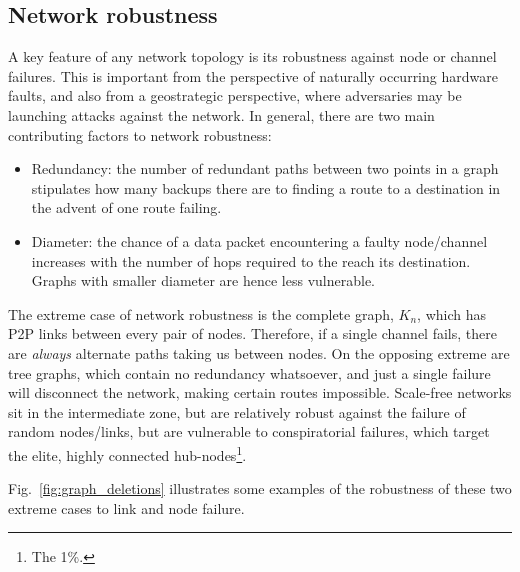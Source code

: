 \subsection{Network robustness}

A key feature of any network topology is its robustness against node or channel failures. This is important from the perspective of naturally occurring hardware faults, and also from a geostrategic perspective, where adversaries may be launching attacks against the network. In general, there are two main contributing factors to network robustness:
\begin{itemize}
	\item Redundancy: the number of redundant paths between two points in a graph stipulates how many backups there are to finding a route to a destination in the advent of one route failing.
	\item Diameter: the chance of a data packet encountering a faulty node/channel increases with the number of hops required to the reach its destination. Graphs with smaller diameter are hence less vulnerable.
\end{itemize}

The extreme case of network robustness is the complete graph, $K_n$, which has P2P links between every pair of nodes. Therefore, if a single channel fails, there are \textit{always} alternate paths taking us between nodes. On the opposing extreme are tree graphs, which contain no redundancy whatsoever, and just a single failure will disconnect the network, making certain routes impossible. Scale-free networks sit in the intermediate zone, but are relatively robust against the failure of random nodes/links, but are vulnerable to conspiratorial failures, which target the elite, highly connected hub-nodes\footnote{The 1\%.}.

Fig.~\ref{fig:graph_deletions} illustrates some examples of the robustness of these two extreme cases to link and node failure.

